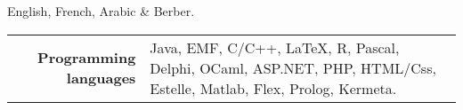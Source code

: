 \documentclass{article} %
\begin{document}
%
%











English, French, Arabic \& Berber.


\begin{tabular}{r @{~~$\rangle$~} p{}}

\textbf{Programming languages} & Java, EMF, C/C++, \LaTeX, R, Pascal, Delphi, OCaml, ASP.NET, PHP, HTML/Css, Estelle, Matlab, Flex, Prolog, Kermeta. \\
\end{tabular}
\end{document}
